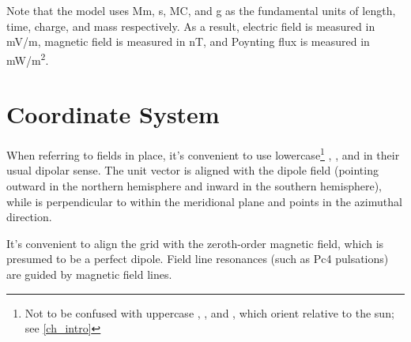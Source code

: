 


Note that the model uses \si{\mega\meter}, \si{\second}, \si{\mega\coulomb}, and \si{\gram} as the fundamental units of length, time, charge, and mass respectively. As a result, electric field is measured in \si{\mV/\meter}, magnetic field is measured in \si{\nano\tesla}, and Poynting flux is measured in \si{\mW/\meter\squared}. 



\section{Coordinate System}
  \label{sec_coords}

When referring to fields in place, it's convenient to use lowercase\footnote{ Not to be confused with uppercase \X, \Y, and \Z, which orient relative to the sun; see \cref{ch_intro} } \x, \y, and \z in their usual dipolar sense. The unit vector \zhat is aligned with the dipole field (pointing outward in the northern hemisphere and inward in the southern hemisphere), while \xhat is perpendicular to \zhat within the meridional plane and \yhat points in the azimuthal direction. 



It's convenient to align the grid with the zeroth-order magnetic field, which is presumed to be a perfect dipole. Field line resonances (such as Pc4 pulsations) are guided by magnetic field lines. 

